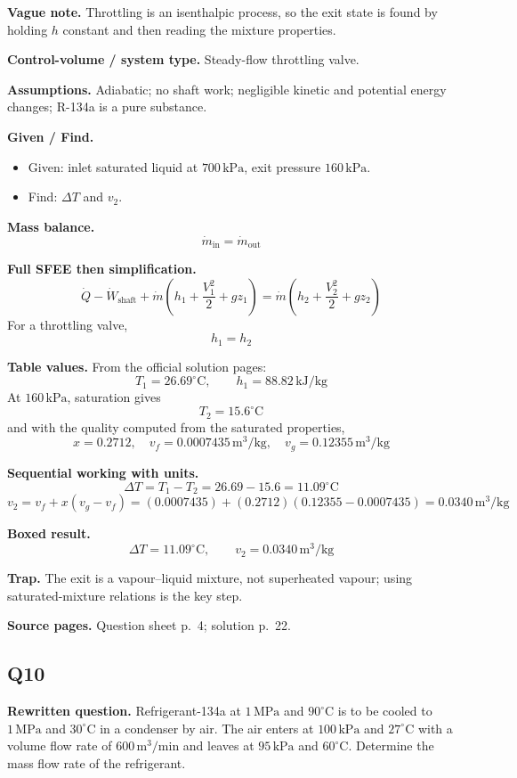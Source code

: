\textbf{Vague note.} Throttling is an isenthalpic process, so the exit state is found by holding $h$ constant and then reading the mixture properties.

\textbf{Control-volume / system type.} Steady-flow throttling valve.

\textbf{Assumptions.} Adiabatic; no shaft work; negligible kinetic and potential energy changes; R-134a is a pure substance.

\textbf{Given / Find.}
\begin{itemize}
  \item Given: inlet saturated liquid at $700\,\text{kPa}$, exit pressure $160\,\text{kPa}$.
  \item Find: $\Delta T$ and $v_2$.
\end{itemize}

\textbf{Mass balance.}
\[
\dot m_{\text{in}}=\dot m_{\text{out}}
\]

\textbf{Full SFEE then simplification.}
\[
\dot Q-\dot W_{\text{shaft}}+\dot m\left(h_1+\frac{V_1^2}{2}+gz_1\right)
=\dot m\left(h_2+\frac{V_2^2}{2}+gz_2\right)
\]
For a throttling valve,
\[
 h_1=h_2
\]

\textbf{Table values.} From the official solution pages:
\[
T_1=26.69^\circ\text{C}, \qquad h_1=88.82\,\text{kJ/kg}
\]
At $160\,\text{kPa}$, saturation gives
\[
T_2=15.6^\circ\text{C}
\]
and with the quality computed from the saturated properties,
\[
x=0.2712,
\quad v_f=0.0007435\,\text{m}^3/\text{kg},
\quad v_g=0.12355\,\text{m}^3/\text{kg}
\]

\textbf{Sequential working with units.}
\[
\Delta T = T_1-T_2 = 26.69-15.6 = 11.09^\circ\text{C}
\]
\[
v_2=v_f+x(v_g-v_f)
=(0.0007435)+(0.2712)(0.12355-0.0007435)
=0.0340\,\text{m}^3/\text{kg}
\]

\textbf{Boxed result.}
\[
\boxed{\Delta T = 11.09^\circ\text{C}, \qquad v_2 = 0.0340\,\text{m}^3/\text{kg}}
\]

\textbf{Trap.} The exit is a vapour--liquid mixture, not superheated vapour; using saturated-mixture relations is the key step.

\textbf{Source pages.} Question sheet p.~4; solution p.~22.

\subsection*{Q10}
\textbf{Rewritten question.} Refrigerant-134a at $1\,\text{MPa}$ and $90^\circ\text{C}$ is to be cooled to $1\,\text{MPa}$ and $30^\circ\text{C}$ in a condenser by air. The air enters at $100\,\text{kPa}$ and $27^\circ\text{C}$ with a volume flow rate of $600\,\text{m}^3/\text{min}$ and leaves at $95\,\text{kPa}$ and $60^\circ\text{C}$. Determine the mass flow rate of the refrigerant.

